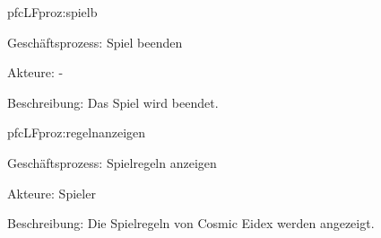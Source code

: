 \begin{description}[leftmargin=5em, style=sameline]
	\begin{lhp}{pfc}{LF}{proz:spielb}
		\item [Geschäftsprozess:] Spiel beenden
		\item [Akteure:] -
		\item [Beschreibung:] Das Spiel wird beendet.
	\end{lhp}
	
	\begin{lhp}{pfc}{LF}{proz:regelnanzeigen}
		\item [Geschäftsprozess:] Spielregeln anzeigen
		\item [Akteure:] Spieler
		\item [Beschreibung:] Die Spielregeln von Cosmic Eidex werden angezeigt.
	\end{lhp}

\end{description}
